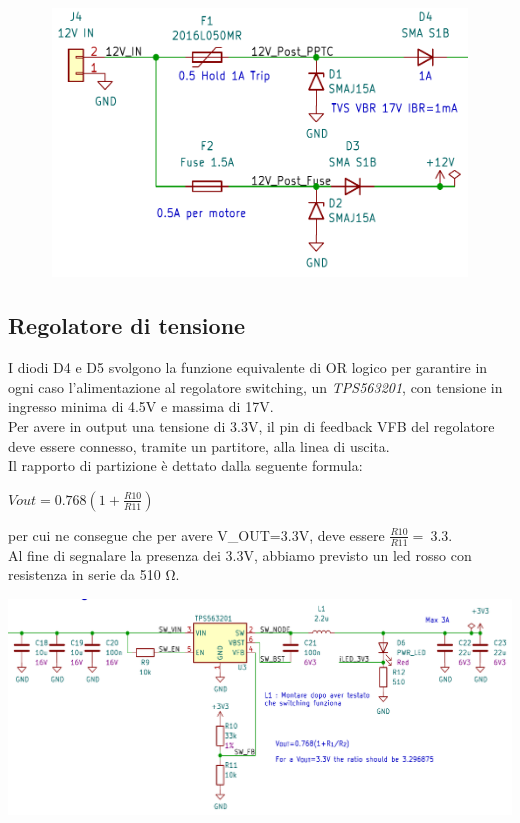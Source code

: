 \begin{center}
\includegraphics[width=6.5in,height=2.80556in]{figures/image105.png}
\captionsetup{type=figure}
\end{center}

\hypertarget{regolatore-di-tensione}{%
\subsection{\texorpdfstring{Regolatore di tensione}{Regolatore di tensione}}\label{regolatore-di-tensione}}

I diodi D4 e D5 svolgono la funzione equivalente di OR logico per garantire in ogni caso l’alimentazione al regolatore switching,
un \emph{TPS563201}, con tensione in ingresso minima di 4.5V e massima di 17V.\\
Per avere in output una tensione di 3.3V, il pin di feedback VFB del regolatore deve essere connesso, tramite un partitore, alla linea di uscita.\\
Il rapporto di partizione è dettato dalla seguente formula:

\(Vout = 0.768(1 + \frac{R10}{R11})\)

per cui ne consegue che per avere V\_OUT=3.3V, deve essere
\(\frac{R10}{R11} = \ 3.3\).\\

Al fine di segnalare la presenza dei 3.3V, abbiamo previsto un led rosso
con resistenza in serie da 510 Ω.

\begin{center}
\includegraphics[scale=0.7]{figures/image103.png}
\captionsetup{type=figure}
\end{center}

